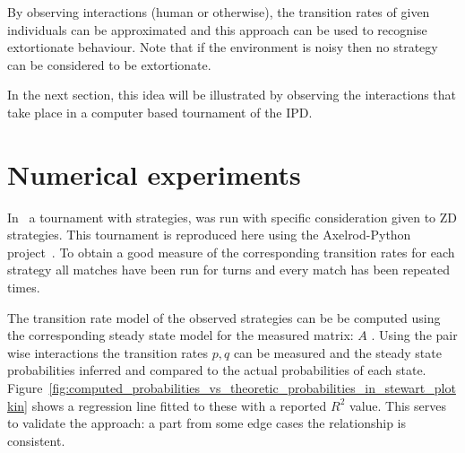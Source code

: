 \documentclass[a4paper]{article}
\begin{document}
By observing interactions (human or otherwise), the transition rates of given
individuals can be approximated and this approach can be used to recognise
extortionate behaviour. Note that if the environment is noisy then no strategy
can be considered to be extortionate.


In the next section, this idea will be illustrated by observing the interactions
that take place in a computer based tournament of the IPD\@.

\section{Numerical experiments}\label{sec:numerical-experiments}

In~\cite{Stewart2012} a tournament with
 strategies,
was run with specific consideration given to ZD strategies. This tournament is
reproduced here using the Axelrod-Python project~\cite{Knight2016}. To obtain a
good measure of the corresponding transition rates for each strategy all matches
have been run for 
turns and every
match has been repeated 
times.

The transition rate model of the observed strategies can be be computed using
the corresponding steady state model for the measured matrix: \(A\)
\cite{Stewart2009}. Using the pair wise interactions the transition rates \(p,
q\) can be measured and the steady state probabilities inferred and compared to
the actual probabilities of each state.
Figure~\ref{fig:computed_probabilities_vs_theoretic_probabilities_in_stewart_plotkin}
shows a regression line fitted to these with a reported \(R^2\) value. This
serves to validate the approach: a part from some edge cases the relationship is
consistent.
\end{document}

